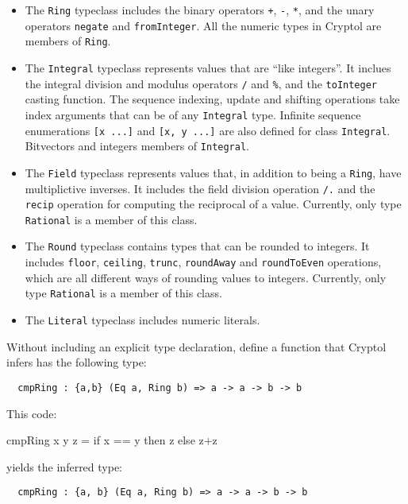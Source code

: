 \begin{itemize}
\item
The \texttt{Ring} typeclass includes the binary operators \texttt{+},
\texttt{-}, \texttt{*}, and the unary operators \texttt{negate}
and \texttt{fromInteger}.  All the numeric types in Cryptol
are members of \texttt{Ring}.

\item
The \texttt{Integral} typeclass represents values that are ``like
integers''.  It inclues the integral division and modulus operators
\texttt{/} and \texttt{\%}, and the \texttt{toInteger} casting function.
The sequence indexing, update and shifting operations
take index arguments that can be of any \texttt{Integral} type.
Infinite sequence enumerations \texttt{[x ...]}
and \texttt{[x, y ...]} are also defined for class \texttt{Integral}.
Bitvectors and integers members of \texttt{Integral}.

\item
The \texttt{Field} typeclass represents values that, in addition to
being a \texttt{Ring}, have multiplictive inverses.
It includes the field division operation \texttt{/.} and the
\texttt{recip} operation for computing the reciprocal of a value.
Currently, only type \texttt{Rational} is a member of this class.

\item
 The \texttt{Round} typeclass contains types that can be
 rounded to integers.  It includes \texttt{floor}, \texttt{ceiling},
 \texttt{trunc}, \texttt{roundAway} and \texttt{roundToEven}
 operations, which are all different ways of rounding values to
 integers. Currently, only type \texttt{Rational} is a member of this class.

\item
The \texttt{Literal} typeclass includes numeric literals.
\end{itemize}

\begin{Exercise}\label{ex:tvar:1}
  Without including an explicit type declaration, define a function
  that Cryptol infers has the following type:
\begin{Verbatim}
  cmpRing : {a,b} (Eq a, Ring b) => a -> a -> b -> b
\end{Verbatim}
\end{Exercise}
\begin{Answer}
This code:
\begin{code}
  cmpRing x y z = if x == y then z else z+z
\end{code}
yields the inferred type:
\begin{Verbatim}
  cmpRing : {a, b} (Eq a, Ring b) => a -> a -> b -> b
\end{Verbatim}
\end{Answer}

